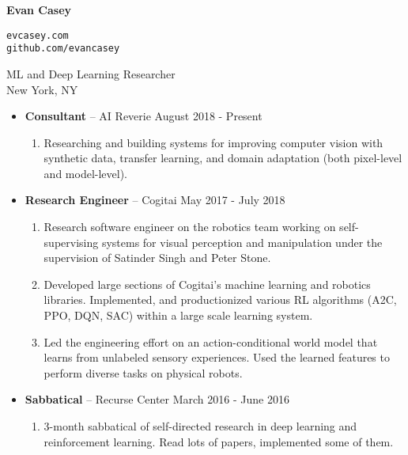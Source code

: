 \documentclass[11pt]{article}
\renewcommand{\section}[1]
{\vspace{1.0\baselineskip}{\Large\textbf{#1}}}
\begin{document}
\thispagestyle{empty}

\parbox[c][0.5in]{3.4in}{\huge \textbf{Evan Casey}}
\parbox[c][0.5in]{2.5in}{%
\small
\vspace{17ex}
\texttt{evcasey.com} \\
\texttt{github.com/evancasey}
}

ML and Deep Learning Researcher \\
New York, NY 

\section{Experience}

\begin{itemize}[leftmargin=12pt]
 \item[] \textbf{Consultant} -- AI Reverie \hfill August 2018 - Present
   \begin{enumerate}[leftmargin=2em,labelindent=16pt,label=$\bullet$]
      \item Researching and building systems for improving computer vision with synthetic data, transfer learning, and domain adaptation (both pixel-level and model-level).
    \end{enumerate}
  \item[] \textbf{Research Engineer} -- Cogitai \hfill May 2017 - July 2018
    \begin{enumerate}[leftmargin=2em,labelindent=16pt,label=$\bullet$]
      \item Research software engineer on the robotics team working on self-supervising systems for visual perception and manipulation under the supervision of Satinder Singh and Peter Stone.
      \item Developed large sections of Cogitai's machine learning and robotics libraries. Implemented, and productionized various RL algorithms (A2C, PPO, DQN, SAC) within a large scale learning system.
      \item Led the engineering effort on an action-conditional world model that learns from unlabeled sensory experiences. Used the learned features to perform diverse tasks on physical robots.
    \end{enumerate}
  \item[] \textbf{Sabbatical} -- Recurse Center \hfill March 2016 - June 2016
    \begin{enumerate}[leftmargin=2em,labelindent=16pt,label=$\bullet$]
      \item 3-month sabbatical of self-directed research in deep learning and reinforcement learning. Read lots of papers, implemented some of them.

\end{enumerate}
\end{itemize}
\end{document}
